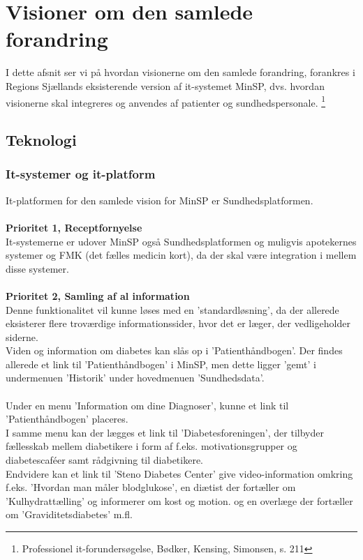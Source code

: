 \section{Visioner om den samlede forandring}
I dette afsnit ser vi på hvordan visionerne om den samlede forandring, forankres i Regions Sjællands eksisterende version af it-systemet MinSP, dvs. hvordan visionerne skal integreres og anvendes af patienter og sundhedspersonale. \footnote{Professionel it-forundersøgelse, Bødker, Kensing, Simonsen, s. 211} 
\subsection{Teknologi}
%
%
\subsubsection{It-systemer og it-platform}
It-platformen for den samlede vision for MinSP er Sundhedsplatformen.
\\\\
\textbf{Prioritet 1, Receptfornyelse} \\
It-systemerne er udover MinSP også Sundhedsplatformen og muligvis apotekernes systemer og FMK (det fælles medicin kort), da der skal være integration i mellem disse systemer.
\\\\
\textbf{Prioritet 2, Samling af al information} \\
%
%
Denne funktionalitet vil kunne løses med en 'standardløsning', da der allerede eksisterer flere troværdige informationssider, hvor det er læger, der vedligeholder siderne. \\
Viden og information om diabetes kan slås op i 'Patienthåndbogen'. Der findes allerede et link til 'Patienthåndbogen' i MinSP, men dette ligger 'gemt' i undermenuen 'Historik' under hovedmenuen 'Sundhedsdata'.
\\ \\
Under en menu 'Information om dine Diagnoser', kunne et link til 'Patienthåndbogen' placeres. \\
I samme menu kan der lægges et link til 'Diabetesforeningen', der tilbyder fællesskab mellem diabetikere i form af f.eks. motivationsgrupper og diabetescaféer samt rådgivning til diabetikere.
\\
Endvidere kan et link til 'Steno Diabetes Center' give video-information omkring f.eks. 'Hvordan man måler blodglukose', en diætist der fortæller om 'Kulhydrattælling' og informerer om kost og motion. og en overlæge der fortæller om 'Graviditetsdiabetes' m.fl. \\
